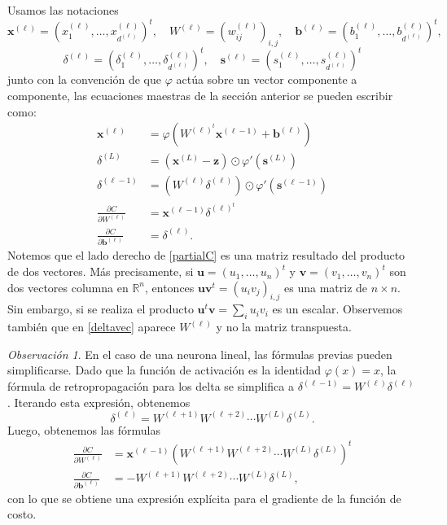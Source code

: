 \documentclass[12pt, a4paper]{amsbook}
\newcommand{\R}{{\mathbb R}}
\newcommand{\sbf}{{\mathbf s}}
\newcommand{\uu}{{\mathbf u}}
\newcommand{\vv}{{\mathbf v}}
\newcommand{\xx}{{\mathbf x}}
\newcommand{\zz}{{\mathbf z}}
\newcommand{\bb}{{\mathbf b}}
\theoremstyle{remark}
\newtheorem{obs}[teo]{Observaci\'on}
\theoremstyle{definition}
\numberwithin{section}{chapter}
\numberwithin{subsection}{section}
\numberwithin{equation}{section}
\numberwithin{figure}{chapter}
\begin{document}
Usamos las notaciones
$$
\xx^{(\ell)} = (x_1^{(\ell)},\dots, x_{d^{(\ell)}}^{(\ell)})^t,\quad W^{(\ell)} = \left(w_{ij}^{(\ell)}\right)_{i,j},\quad \bb^{(\ell)} = (b_1^{(\ell)},\dots, b_{d^{(\ell)}}^{(\ell)})^t,
$$
$$
\delta^{(\ell)} = (\delta_1^{(\ell)},\dots, \delta_{d^{(\ell)}}^{(\ell)})^t,\quad \sbf^{(\ell)} = (s_1^{(\ell)},\dots, s_{d^{(\ell)}}^{(\ell)})^t
$$
junto con la convención de que $\varphi$ actúa sobre un vector componente a componente, las ecuaciones maestras de la sección anterior se pueden escribir como:
\begin{align}
\xx^{(\ell)} &= \varphi\left(W^{(\ell)^t} \xx^{(\ell-1)} + \bb^{(\ell)}\right)\\
\label{deltaL2}\delta^{(L)} &= (\xx^{(L)} - \zz)\odot \varphi'(\sbf^{(L)}) \\
\label{deltavec}\delta^{(\ell-1)} &= (W^{(\ell)}\delta^{(\ell)})\odot \varphi'(\sbf^{(\ell-1)}) \\
\label{partialC}\frac{\partial C}{\partial W^{(\ell)}} &= \xx^{(\ell-1)}\delta^{(\ell)^t} \\
\frac{\partial C}{\partial \bb^{(\ell)}} &= \delta^{(\ell)}.
\end{align}
Notemos que el lado derecho de \eqref{partialC} es una matriz resultado del producto de dos vectores. Más precisamente, si $\uu=(u_1,\dots, u_n)^t$ y $\vv=(v_1,\dots, v_n)^t$ son dos vectores columna en $\R^n$, entonces $\uu\vv^t = (u_iv_j)_{i,j}$ es una matriz de $n\times n$. Sin embargo, si se realiza el producto $\uu^t\vv = \sum_i u_i v_i$ es un escalar. Observemos también que en \eqref{deltavec} aparece $W^{(\ell)}$ y no la matriz transpuesta.

\begin{obs}
En el caso de una neurona lineal, las fórmulas previas pueden simplificarse. Dado que la función de activación es la identidad $\varphi(x)=x$, la fórmula de retropropagación para los delta se simplifica a $\delta^{(\ell-1)} = W^{(\ell)}\delta^{(\ell)}$. Iterando esta expresión, obtenemos
$$
\delta^{(\ell)} = W^{(\ell+1)}W^{(\ell+2)}\cdots W^{(L)}\delta^{(L)}.
$$
Luego, obtenemos las fórmulas
\begin{align*}
\frac{\partial C}{\partial W^{(\ell)}} &= \xx^{(\ell-1)}(W^{(\ell+1)}W^{(\ell+2)}\cdots W^{(L)}\delta^{(L)})^t\\
\frac{\partial C}{\partial \bb^{(\ell)}} &= -W^{(\ell+1)}W^{(\ell+2)}\cdots W^{(L)}\delta^{(L)},
\end{align*}
con lo que se obtiene una expresión explícita para el gradiente de la función de costo.
\end{obs}
\end{document}
